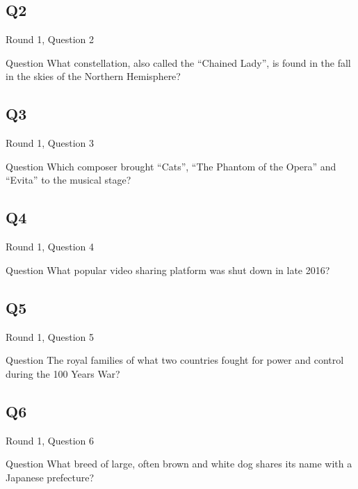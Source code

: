 \documentclass[11pt]{beamer}
\begin{document}
\subsection*{Q2}
\begin{frame}[t]{Round 1, Question 2}
\vspace{2em}
\begin{block}{Question}
What constellation, also called the ``Chained Lady'', is found in the fall in the skies of the Northern Hemisphere\@?
\end{block}
\end{frame}
    

\subsection*{Q3}
\begin{frame}[t]{Round 1, Question 3}
\vspace{2em}
\begin{block}{Question}
Which composer brought ``Cats'', ``The Phantom of the Opera'' and ``Evita'' to the musical stage\@?
\end{block}
\end{frame}
    

\subsection*{Q4}
\begin{frame}[t]{Round 1, Question 4}
\vspace{2em}
\begin{block}{Question}
What popular video sharing platform was shut down in late 2016\@?
\end{block}
\end{frame}
    

\subsection*{Q5}
\begin{frame}[t]{Round 1, Question 5}
\vspace{2em}
\begin{block}{Question}
The royal families of what two countries fought for power and control during the 100 Years War\@?
\end{block}
\end{frame}
    

\subsection*{Q6}
\begin{frame}[t]{Round 1, Question 6}
\vspace{2em}
\begin{block}{Question}
What breed of large, often brown and white dog shares its name with a Japanese prefecture\@?
\end{block}
\end{frame}
    
\end{document}
